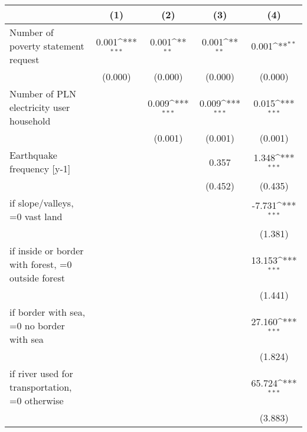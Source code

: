 {
\def\sym#1{\ifmmode^{#1}\else\(^{#1}\)\fi}
\begin{tabular}{l*{4}{c}}
\toprule
                    &\multicolumn{1}{c}{(1)}         &\multicolumn{1}{c}{(2)}         &\multicolumn{1}{c}{(3)}         &\multicolumn{1}{c}{(4)}         \\
\midrule
Number of poverty statement request&       0.001\sym{***}&       0.001\sym{**} &       0.001\sym{**} &       0.001\sym{**} \\
                    &     (0.000)         &     (0.000)         &     (0.000)         &     (0.000)         \\
\addlinespace
Number of PLN electricity user household&                     &       0.009\sym{***}&       0.009\sym{***}&       0.015\sym{***}\\
                    &                     &     (0.001)         &     (0.001)         &     (0.001)         \\
\addlinespace
Earthquake frequency [y-1]&                     &                     &       0.357         &       1.348\sym{***}\\
                    &                     &                     &     (0.452)         &     (0.435)         \\
\addlinespace
=1 if slope/valleys, =0 vast land&                     &                     &                     &      -7.731\sym{***}\\
                    &                     &                     &                     &     (1.381)         \\
\addlinespace
=1 if inside or border with forest, =0 outside forest&                     &                     &                     &      13.153\sym{***}\\
                    &                     &                     &                     &     (1.441)         \\
\addlinespace
=1 if border with sea, =0 no border with sea&                     &                     &                     &      27.160\sym{***}\\
                    &                     &                     &                     &     (1.824)         \\
\addlinespace
=1 if river used for transportation, =0 otherwise&                     &                     &                     &      65.724\sym{***}\\
                    &                     &                     &                     &     (3.883)         \\

\end{tabular}}

